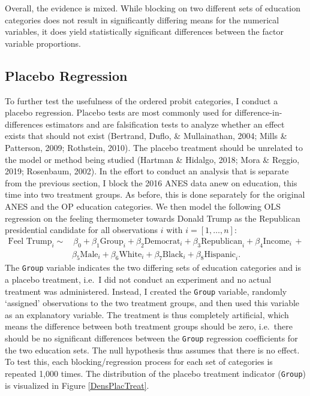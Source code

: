 \documentclass[12pt,econ]{sources/authesis}
\begin{document}
\dsp

\normalsize

Overall, the evidence is mixed. While blocking on two different sets of education categories does not result in significantly differing means for the numerical variables, it does yield statistically significant differences between the factor variable proportions.

\hypertarget{ordblock-data-plac}{%
\subsection{Placebo Regression}\label{ordblock-data-plac}}

To further test the usefulness of the ordered probit categories, I conduct a placebo regression. Placebo tests are most commonly used for difference-in-differences estimators and are falsification tests to analyze whether an effect exists that should not exist (Bertrand, Duflo, \& Mullainathan, 2004; Mills \& Patterson, 2009; Rothstein, 2010). The placebo treatment should be unrelated to the model or method being studied (Hartman \& Hidalgo, 2018; Mora \& Reggio, 2019; Rosenbaum, 2002). In the effort to conduct an analysis that is separate from the previous section, I block the 2016 ANES data anew on education, this time into two treatment groups. As before, this is done separately for the original ANES and the OP education categories. We then model the following OLS regression on the feeling thermometer towards Donald Trump as the Republican presidential candidate for all observations \(i\) with \(i = [1,\ldots,n]\):
\begin{align}
\text{Feel Trump}_i \sim & \,\beta_0 + \beta_1 \text{Group}_i + \beta_2 \text{Democrat}_i + \beta_3 \text{Republican}_i + \beta_4 \text{Income}_i \,+ \nonumber \\ 
& \beta_5 \text{Male}_i + \beta_6 \text{White}_i + \beta_7 \text{Black}_i + \beta_8 \text{Hispanic}_i.
\end{align}
The \texttt{Group} variable indicates the two differing sets of education categories and is a placebo treatment, i.e.~I did not conduct an experiment and no actual treatment was administered. Instead, I created the \texttt{Group} variable, randomly `assigned' observations to the two treatment groups, and then used this variable as an explanatory variable. The treatment is thus completely artificial, which means the difference between both treatment groups should be zero, i.e.~there should be no significant differences between the \texttt{Group} regression coefficients for the two education sets. The null hypothesis thus assumes that there is no effect. To test this, each blocking/regression process for each set of categories is repeated 1,000 times. The distribution of the placebo treatment indicator (\texttt{Group}) is visualized in Figure \ref{DensPlacTreat}.
\end{document}
